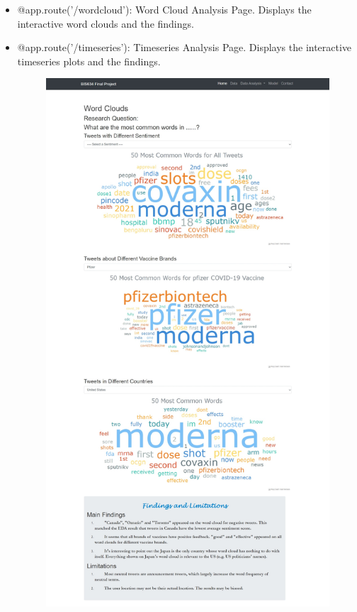 \documentclass{article}
\begin{document}
\begin{itemize}
    \item @app.route('/wordcloud'): Word Cloud Analysis Page. Displays the interactive word clouds and the findings.
    \item @app.route('/timeseries'): Timeseries Analysis Page. Displays the interactive timeseries plots and the findings.
    \begin{figure}[H]
    \centering
    \begin{minipage}[H]{.5\textwidth}
      \centering
      \includegraphics[width=\linewidth]{WordCloud.jpeg}

\end{minipage}
\end{figure}
\end{itemize}
\end{document}
